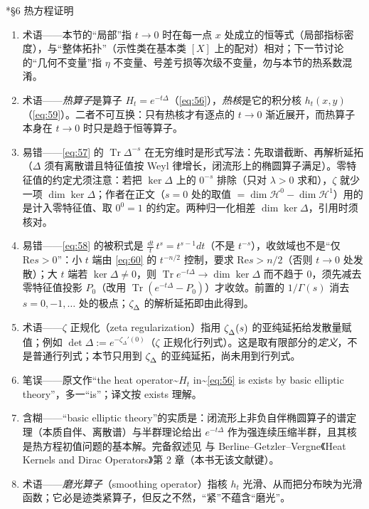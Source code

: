 \documentclass[11pt]{amsart}
\makeatletter
\def\subsection{\@startsection{subsection}{2}%
   \z@{1.25\linespacing\@plus.7\linespacing}{.5\linespacing}%
   {\normalfont\bfseries}}
\theoremstyle{definition}
\theoremstyle{remark}
\theoremstyle{plain}
\numberwithin{equation}{section}
\renewcommand{\:}{\colon}
\DeclareMathOperator{\Tr}{Tr}
\DeclareRobustCommand{\mstrut}{^{\vphantom{1*\prime y\vee M}}}
\newcommand{\sH}{\mathscr{H}}
\newcommand{\zD}{\zeta \mstrut _\Delta }
\renewcommand{\Re}{\text{Re}}
\makeatother
\begin{document}
\subsection*{§6 热方程证明}
\begin{enumerate}[leftmargin=2.2em,itemsep=2pt,topsep=2pt]
  \item 术语——本节的“局部”指 $t\to0$ 时在每一点 $x$ 处成立的恒等式（局部指标密度），与“整体拓扑”（示性类在基本类 $[X]$ 上的配对）相对；下一节讨论的“几何不变量”指 $\eta$ 不变量、号差亏损等次级不变量，勿与本节的热系数混淆。
  \item 术语——\emph{热算子}是算子 $H_t=e^{-t\Delta}$（\eqref{eq:56}），\emph{热核}是它的积分核 $h_t(x,y)$（\eqref{eq:59}）。二者不可互换：只有热核才有逐点的 $t\to0$ 渐近展开，而热算子本身在 $t\to0$ 时只是趋于恒等算子。
  \item 易错——\eqref{eq:57} 的 $\Tr\Delta^{-s}$ 在无穷维时是形式写法：先取谱截断、再解析延拓（$\Delta$ 须有离散谱且特征值按 Weyl 律增长，闭流形上的椭圆算子满足）。零特征值的约定尤须注意：若把 $\ker\Delta$ 上的 $0^{-s}$ 排除（只对 $\lambda>0$ 求和），$\zeta$ 就少一项 $\dim\ker\Delta$；作者在正文（$s=0$ 处的取值 $=\dim\sH^0-\dim\sH^1$）用的是计入零特征值、取 $0^0=1$ 的约定。两种归一化相差 $\dim\ker\Delta$，引用时须核对。
  \item 易错——\eqref{eq:58} 的被积式是 $\frac{dt}{t}\,t^s=t^{s-1}dt$（不是 $t^{-s}$），收敛域也不是“仅 $\Re s>0$”：小 $t$ 端由 \eqref{eq:60} 的 $t^{-n/2}$ 控制，要求 $\Re s>n/2$（否则 $t\to0$ 处发散）；大 $t$ 端若 $\ker\Delta\neq0$，则 $\Tr e^{-t\Delta}\to\dim\ker\Delta$ 而不趋于 $0$，须先减去零特征值投影 $P_0$（改用 $\Tr(e^{-t\Delta}-P_0)$）才收敛。前置的 $1/\Gamma(s)$ 消去 $s=0,-1,\dots$ 处的极点；$\zD$ 的解析延拓即由此得到。
  \item 术语——$\zeta$ 正规化（zeta regularization）指用 $\zD(s)$ 的亚纯延拓给发散量赋值；例如 $\det\Delta:=e^{-\zeta_\Delta'(0)}$（$\zeta$ 正规化行列式）。这是取有限部分的\emph{定义}，不是普通行列式；本节只用到 $\zD$ 的亚纯延拓，尚未用到行列式。
  \item 笔误——原文作“the heat operator\textasciitilde{}$H_t$ in\textasciitilde{}\eqref{eq:56} is exists by basic elliptic theory”，多一“is”；译文按 exists 理解。
  \item 含糊——“basic elliptic theory”的实质是：闭流形上非负自伴椭圆算子的谱定理（本质自伴、离散谱）与半群理论给出 $e^{-t\Delta}$ 作为强连续压缩半群，且其核是热方程初值问题的基本解。完备叙述见 \cite{Se4} 与 Berline–Getzler–Vergne《Heat Kernels and Dirac Operators》第 2 章（本书无该文献键）。
  \item 术语——\emph{磨光算子}（smoothing operator）指核 $h_t$ 光滑、从而把分布映为光滑函数；它必是迹类紧算子，但反之不然，“紧”不蕴含“磨光”。

\end{enumerate}
\end{document}
